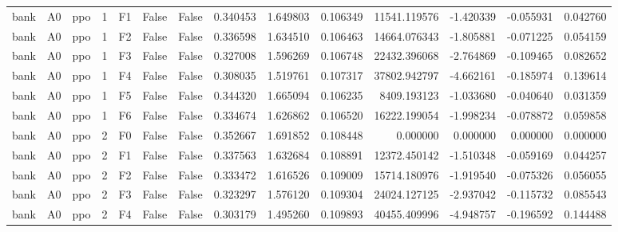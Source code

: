 \begin{tabular}{lllrlllrrrrrrr}
      bank &      A0 &       ppo &     1 &  F1 &           False &            False &  0.340453 &  1.649803 & 0.106349 &     11541.119576 &          -1.420339 &       -0.055931 &            0.042760 \\
      bank &      A0 &       ppo &     1 &  F2 &           False &            False &  0.336598 &  1.634510 & 0.106463 &     14664.076343 &          -1.805881 &       -0.071225 &            0.054159 \\
      bank &      A0 &       ppo &     1 &  F3 &           False &            False &  0.327008 &  1.596269 & 0.106748 &     22432.396068 &          -2.764869 &       -0.109465 &            0.082652 \\
      bank &      A0 &       ppo &     1 &  F4 &           False &            False &  0.308035 &  1.519761 & 0.107317 &     37802.942797 &          -4.662161 &       -0.185974 &            0.139614 \\
      bank &      A0 &       ppo &     1 &  F5 &           False &            False &  0.344320 &  1.665094 & 0.106235 &      8409.193123 &          -1.033680 &       -0.040640 &            0.031359 \\
      bank &      A0 &       ppo &     1 &  F6 &           False &            False &  0.334674 &  1.626862 & 0.106520 &     16222.199054 &          -1.998234 &       -0.078872 &            0.059858 \\
      bank &      A0 &       ppo &     2 &  F0 &           False &            False &  0.352667 &  1.691852 & 0.108448 &         0.000000 &           0.000000 &        0.000000 &            0.000000 \\
      bank &      A0 &       ppo &     2 &  F1 &           False &            False &  0.337563 &  1.632684 & 0.108891 &     12372.450142 &          -1.510348 &       -0.059169 &            0.044257 \\
      bank &      A0 &       ppo &     2 &  F2 &           False &            False &  0.333472 &  1.616526 & 0.109009 &     15714.180976 &          -1.919540 &       -0.075326 &            0.056055 \\
      bank &      A0 &       ppo &     2 &  F3 &           False &            False &  0.323297 &  1.576120 & 0.109304 &     24024.127125 &          -2.937042 &       -0.115732 &            0.085543 \\
      bank &      A0 &       ppo &     2 &  F4 &           False &            False &  0.303179 &  1.495260 & 0.109893 &     40455.409996 &          -4.948757 &       -0.196592 &            0.144488 \\

\end{tabular}

